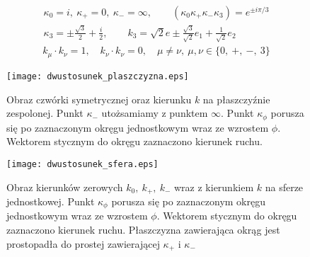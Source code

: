 \begin{align}\label{dwustosunek_kappa}
\kappa_0 = i,\ \kappa_+ = 0,\ \kappa_-=\infty,
\qquad (\kappa_0\kappa_+\kappa_-\kappa_3)
 = e^{\pm i\pi/3} \\ \label{kappa3_wynikPM}
\kappa_3 =\pm  \frac{\sqrt{3}}{2} + \frac{i}{2}, \qquad
k_3 = \sqrt{2} e\pm \frac{\sqrt{3}}{\sqrt{2}}e_1+ \frac{1}{\sqrt{2}} e_2
\end{align}
\begin{align*}
k_\mu \cdot k_\nu = 1 , 
\quad k_\nu \cdot k_\nu = 0,\quad \mu \neq \nu ,\ 
\mu,\nu \in \{0,\ +,\ -,\ 3\}
\end{align*}
\begin{figure}
\centering
\texttt{[image: dwustosunek\_plaszczyzna.eps]}
\caption{Obraz czwórki symetrycznej oraz kierunku $k$ na płaszczyźnie 
zespolonej.
Punkt $\kappa_- $ utożsamiamy z punktem $\infty$.
Punkt $\kappa_\phi$ porusza się po zaznaczonym okręgu jednostkowym 
wraz ze wzrostem $\phi$. Wektorem stycznym do okręgu zaznaczono 
kierunek ruchu.}
\label{dwustosunek_plaszczyzna}
\end{figure}
\begin{figure}
\centering
\texttt{[image: dwustosunek\_sfera.eps]}
\caption{Obraz kierunków zerowych $k_0,\ k_+,\ k_-$ wraz z kierunkiem $k$
na sferze jednostkowej. 
Punkt $\kappa_\phi$ porusza się po zaznaczonym okręgu jednostkowym 
wraz ze wzrostem $\phi$. Wektorem stycznym do okręgu zaznaczono kierunek 
ruchu.
Płaszczyzna zawierająca okrąg jest prostopadła do prostej zawierającej 
$\kappa_+$ i $\kappa_-$}
\label{dwustosunek_sfera}
\end{figure}
\newpage

